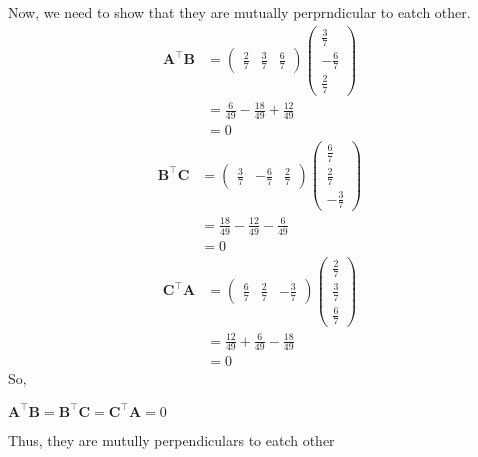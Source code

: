 \documentclass[journal,12pt,twocolumn]{IEEEtran}
\newcommand{\myvec}[1]{\ensuremath{\begin{pmatrix}#1\end{pmatrix}}}
\let\vec\mathbf
\begin{document}
Now, we need to show that they are mutually perprndicular to eatch other.
\begin{align}
\vec{A}^{\top}\vec{B}&=\myvec{\frac{2}{7}&\frac{3}{7}&\frac{6}{7}}\myvec{\frac{3}{7}\\-\frac{6}{7}\\ \frac{2}{7}}\\
&=\frac{6}{49}-\frac{18}{49}+\frac{12}{49}\\
&=0
\end{align}
\begin{align}
\vec{B}^{\top}\vec{C}&=\myvec{\frac{3}{7}&-\frac{6}{7}&\frac{2}{7}}\myvec{\frac{6}{7}\\ \frac{2}{7}\\-\frac{3}{7}}\\
&=\frac{18}{49}-\frac{12}{49}-\frac{6}{49}\\
&=0
\end{align}
\begin{align}
\vec{C}^{\top}\vec{A}&=\myvec{\frac{6}{7}&\frac{2}{7}&-\frac{3}{7}}\myvec{\frac{2}{7}\\ \frac{3}{7}\\ \frac{6}{7}}\\
&=\frac{12}{49}+\frac{6}{49}-\frac{18}{49}\\
&=0
\end{align}
So,\begin{center}
    $\vec{A}^{\top}\vec{B}=\vec{B}^{\top}\vec{C}=\vec{C}^{\top}\vec{A}=0$
\end{center}
Thus, they are mutully perpendiculars to eatch other
\end{document}
